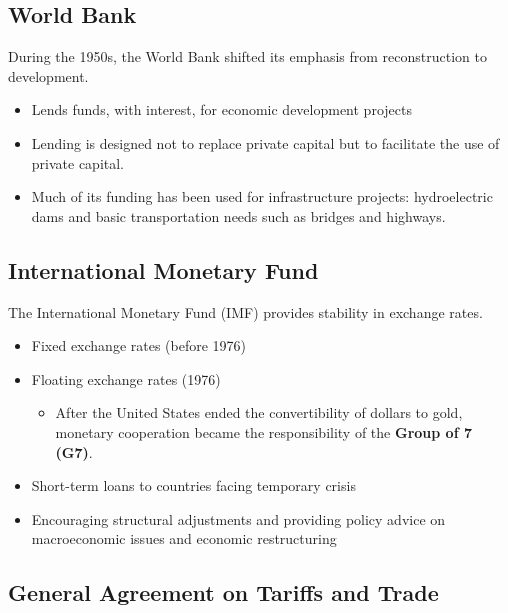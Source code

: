 \documentclass[
]{book}
\providecommand{\tightlist}{%
  \setlength{\itemsep}{0pt}\setlength{\parskip}{0pt}}
\begin{document}
\hypertarget{world-bank}{%
\subsection{World Bank}\label{world-bank}}

During the 1950s, the World Bank shifted its emphasis from reconstruction to development.

\begin{itemize}
\item
  Lends funds, with interest, for economic development projects
\item
  Lending is designed not to replace private capital but to facilitate the use of private capital.
\item
  Much of its funding has been used for infrastructure projects: hydroelectric dams and basic transportation needs such as bridges and highways.
\end{itemize}

\hypertarget{international-monetary-fund}{%
\subsection{International Monetary Fund}\label{international-monetary-fund}}

The International Monetary Fund (IMF) provides stability in exchange rates.

\begin{itemize}
\item
  Fixed exchange rates (before 1976)
\item
  Floating exchange rates (1976)

  \begin{itemize}
  \tightlist
  \item
    After the United States ended the convertibility of dollars to gold, monetary cooperation became the responsibility of the \textbf{Group of 7 (G7)}.
  \end{itemize}
\item
  Short-term loans to countries facing temporary crisis
\item
  Encouraging structural adjustments and providing policy advice on macroeconomic issues and economic restructuring
\end{itemize}

\hypertarget{general-agreement-on-tariffs-and-trade}{%
\subsection{General Agreement on Tariffs and Trade}\label{general-agreement-on-tariffs-and-trade}}
\end{document}
